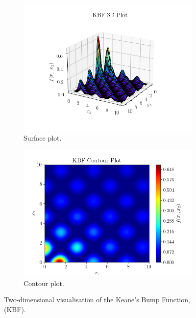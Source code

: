 \documentclass[10pt]{article}
\begin{document}
\begin{multicols}{2}
\begin{figure}[H]
    \centering
    \begin{subfigure}{0.49\textwidth}
        \centering
        \includegraphics[width=\textwidth]{../figures/KBF/KBF_surf.png}
        \caption{Surface plot.}
        \label{fig:KBF_surf}
    \end{subfigure}
    \begin{subfigure}{0.46\textwidth}
        \centering
        \includegraphics[width=\textwidth]{../figures/KBF/KBF_contour.png}
        \caption{Contour plot.}
        \label{fig:KBF_contour}
    \end{subfigure}
        \captionsetup{justification=centering}
        \caption{Two-dimensional visualisation of the Keane's Bump Function, (KBF).}
        \label{fig:KBF_2D}
\end{figure}


\end{multicols}
\end{document}
